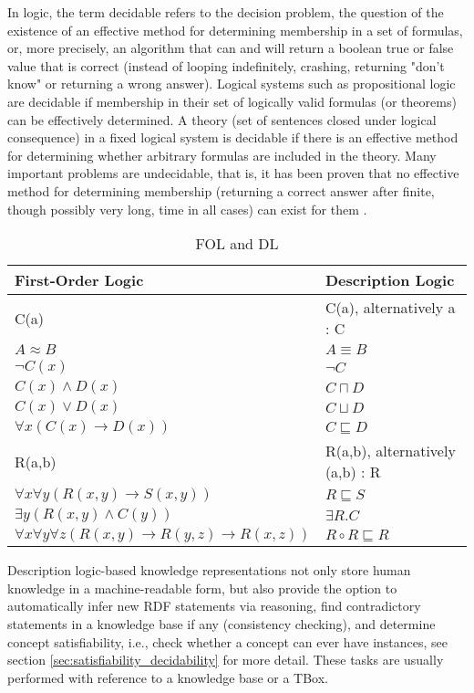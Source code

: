 In logic, the term decidable refers to the decision problem, the question of the existence of an effective method for determining membership in a set of formulas, or, more precisely, an algorithm that can and will return a boolean true or false value that is correct (instead of looping indefinitely, crashing, returning "don't know" or returning a wrong answer). Logical systems such as propositional logic are decidable if membership in their set of logically valid formulas (or theorems) can be effectively determined. A theory (set of sentences closed under logical consequence) in a fixed logical system is decidable if there is an effective method for determining whether arbitrary formulas are included in the theory. Many important problems are undecidable, that is, it has been proven that no effective method for determining membership (returning a correct answer after finite, though possibly very long, time in all cases) can exist for them \cite{Decidability}.

\begin{longtable}[h]{ p{65mm} p{65mm} }
\caption{FOL and DL}
\label{table:FOL_DL}\\
\hline
First-Order Logic & Description Logic\\
\hline
C(a) & C(a), alternatively a : C\\
$A \approx B$ & $A \equiv B$\\
$\neg C(x)$ & $\neg C$\\
$C(x) \land D(x)$ &	$C \sqcap D$\\
$C(x) \lor D(x)$ & $C \sqcup D$\\
$\forall x(C(x) \rightarrow D(x))$ & $C \sqsubseteq D$\\
R(a,b) & R(a,b), alternatively (a,b) : R\\
$\forall x \forall y(R(x,y) \rightarrow S(x,y))$ & $R \sqsubseteq S$\\
$\exists y(R(x,y) \land C(y))$ & $\exists R.C$\\
$\forall x \forall y \forall z(R(x,y) \rightarrow R(y,z) \rightarrow R(x,z))$ & $R \circ R \sqsubseteq R$\\
\hline
\end{longtable}

Description logic-based knowledge representations not only store human knowledge in a machine-readable form, but also provide the option to automatically infer new RDF statements via reasoning, find contradictory statements in a knowledge base if any (consistency checking), and determine concept satisfiability, i.e., check whether a concept can ever have instances, see section \ref{sec:satisfiability_decidability} for more detail. These tasks are usually performed with reference to a knowledge base or a TBox.


